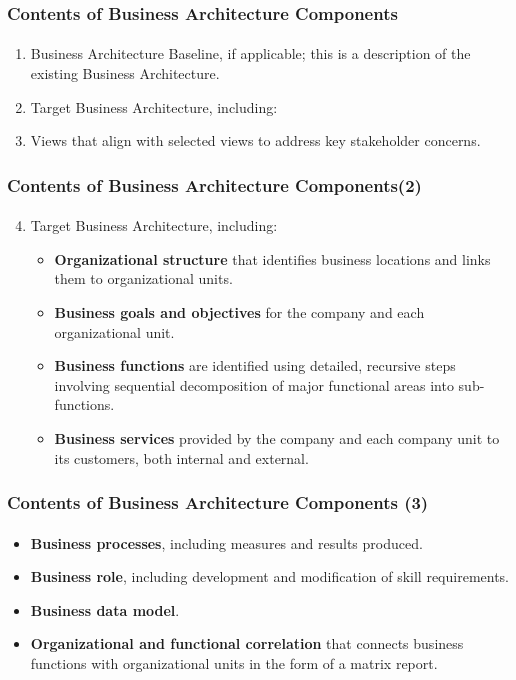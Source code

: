 \documentclass[aspectratio=169, table]{beamer}
\begin{document}
\begin{frame}
    \frametitle{Contents of Business Architecture Components}
     \framesubtitle{\hspace{1cm}}
    \begin{enumerate}
        \item Business Architecture Baseline, if applicable; this is a description of the existing Business Architecture.
        \item Target Business Architecture, including:
        \item Views that align with selected views to address key stakeholder concerns.
    \end{enumerate}
\end{frame}

\begin{frame}
    \frametitle{Contents of Business Architecture Components(2)}
     \framesubtitle{\hspace{1cm}}
    \begin{enumerate}
        \setcounter{enumi}{3}
        \item Target Business Architecture, including:
        \begin{itemize}
            \item \textbf{Organizational structure} that identifies business locations and links them to organizational units.
            \item \textbf{Business goals and objectives} for the company and each organizational unit.
            \item \textbf{Business functions} are identified using detailed, recursive steps involving sequential decomposition of major functional areas into sub-functions.
            \item \textbf{Business services} provided by the company and each company unit to its customers, both internal and external.
        \end{itemize}
    \end{enumerate}
\end{frame}


\begin{frame}
    \frametitle{Contents of Business Architecture Components (3)}
     \framesubtitle{\hspace{1cm}}
    \begin{itemize}
        \item \textbf{Business processes}, including measures and results produced.
        \item \textbf{Business role}, including development and modification of skill requirements.
        \item \textbf{Business data model}.
        \item \textbf{Organizational and functional correlation} that connects business functions with organizational units in the form of a matrix report.
    \end{itemize}
\end{frame}
\end{document}
